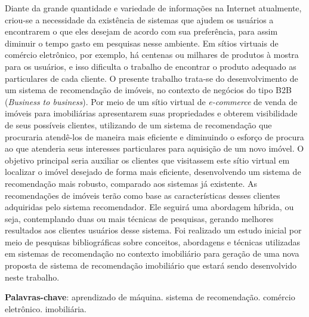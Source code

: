 \begin{resumo}

Diante da grande quantidade e variedade de informações na Internet atualmente, criou-se a necessidade da existência de sistemas que ajudem os usuários a encontrarem o que eles desejam de acordo com sua preferência, para assim diminuir o tempo gasto em pesquisas nesse ambiente. Em sítios virtuais de comércio eletrônico, por exemplo, há centenas ou milhares de produtos à mostra para os usuários, e isso dificulta o trabalho de encontrar o produto adequado as particulares de cada cliente. O presente trabalho trata-se do desenvolvimento de um sistema de recomendação de imóveis, no contexto de negócios do tipo B2B (\textit{Business to business}). Por meio de um sítio virtual de \textit{e-commerce} de venda de imóveis para imobiliárias apresentarem suas propriedades e obterem visibilidade de seus possíveis clientes, utilizando de um sistema de recomendação que procuraria atendê-los de maneira mais eficiente e diminuindo o esforço de procura ao que atenderia seus interesses particulares para aquisição de um novo imóvel. O objetivo principal seria auxiliar os clientes que visitassem este sítio virtual em localizar o imóvel desejado de forma mais eficiente, desenvolvendo um sistema de recomendação mais robusto, comparado aos sistemas já existente. As recomendações de imóveis terão como base as características desses clientes adquiridas pelo sistema recomendador. Ele seguirá uma abordagem híbrida, ou seja, contemplando duas ou mais técnicas de pesquisas, gerando melhores resultados aos clientes usuários desse sistema. Foi realizado um estudo inicial por meio de pesquisas bibliográficas sobre conceitos, abordagens e técnicas utilizadas em sistemas de recomendação no contexto imobiliário para geração de uma nova proposta de sistema de recomendação imobiliário que estará sendo desenvolvido neste trabalho.

 \vspace{\onelineskip}
    
 \noindent
 \textbf{Palavras-chave}: aprendizado de máquina. sistema de recomendação. comércio eletrônico. imobiliária.
\end{resumo}

